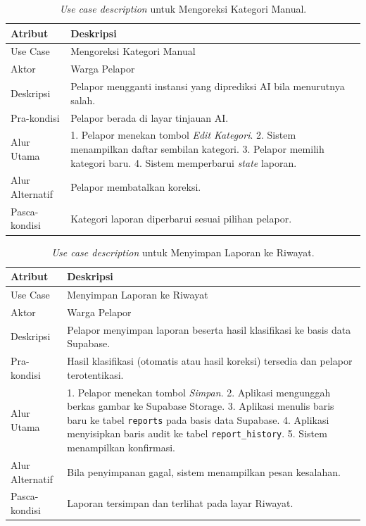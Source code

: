 \begin{table}[htbp]
\centering
\caption{\textit{Use case description} untuk Mengoreksi Kategori Manual.}
\label{tab:uc-koreksi}
\begin{tabular}{p{3.5cm} p{9cm}}
\toprule
\textbf{Atribut} & \textbf{Deskripsi} \\
\midrule
Use Case & Mengoreksi Kategori Manual \\
Aktor & Warga Pelapor \\
Deskripsi & Pelapor mengganti instansi yang diprediksi AI bila menurutnya salah. \\
Pra-kondisi & Pelapor berada di layar tinjauan AI. \\
Alur Utama & 1. Pelapor menekan tombol \textit{Edit Kategori}. 2. Sistem menampilkan daftar sembilan kategori. 3. Pelapor memilih kategori baru. 4. Sistem memperbarui \textit{state} laporan. \\
Alur Alternatif & Pelapor membatalkan koreksi. \\
Pasca-kondisi & Kategori laporan diperbarui sesuai pilihan pelapor. \\
\bottomrule
\end{tabular}
\end{table}

\begin{table}[htbp]
\centering
\caption{\textit{Use case description} untuk Menyimpan Laporan ke Riwayat.}
\label{tab:uc-simpan}
\begin{tabular}{p{3.5cm} p{9cm}}
\toprule
\textbf{Atribut} & \textbf{Deskripsi} \\
\midrule
Use Case & Menyimpan Laporan ke Riwayat \\
Aktor & Warga Pelapor \\
Deskripsi & Pelapor menyimpan laporan beserta hasil klasifikasi ke basis data Supabase. \\
Pra-kondisi & Hasil klasifikasi (otomatis atau hasil koreksi) tersedia dan pelapor terotentikasi. \\
Alur Utama & 1. Pelapor menekan tombol \textit{Simpan}. 2. Aplikasi mengunggah berkas gambar ke Supabase Storage. 3. Aplikasi menulis baris baru ke tabel \texttt{reports} pada basis data Supabase. 4. Aplikasi menyisipkan baris audit ke tabel \texttt{report\_history}. 5. Sistem menampilkan konfirmasi. \\
Alur Alternatif & Bila penyimpanan gagal, sistem menampilkan pesan kesalahan. \\
Pasca-kondisi & Laporan tersimpan dan terlihat pada layar Riwayat. \\
\bottomrule
\end{tabular}
\end{table}

